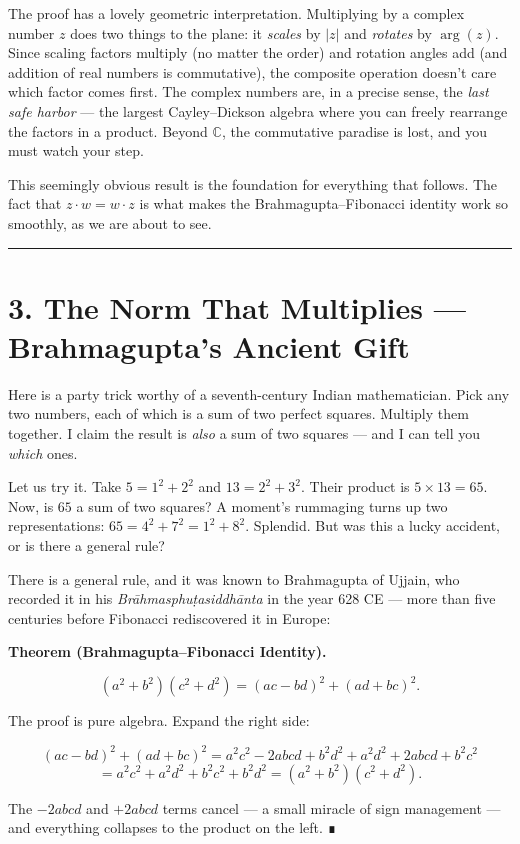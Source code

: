 The proof has a lovely geometric interpretation. Multiplying by a complex number \(z\) does two things to the plane: it \emph{scales} by \(|z|\) and \emph{rotates} by \(\arg(z)\). Since scaling factors multiply (no matter the order) and rotation angles add (and addition of real numbers is commutative), the composite operation doesn't care which factor comes first. The complex numbers are, in a precise sense, the \emph{last safe harbor} --- the largest Cayley--Dickson algebra where you can freely rearrange the factors in a product. Beyond \(\mathbb{C}\), the commutative paradise is lost, and you must watch your step.

This seemingly obvious result is the foundation for everything that follows. The fact that \(z \cdot w = w \cdot z\) is what makes the Brahmagupta--Fibonacci identity work so smoothly, as we are about to see.

\bigskip\noindent\rule{\linewidth}{0.4pt}\bigskip

\section{3. The Norm That Multiplies --- Brahmagupta's Ancient Gift}
Here is a party trick worthy of a seventh-century Indian mathematician. Pick any two numbers, each of which is a sum of two perfect squares. Multiply them together. I claim the result is \emph{also} a sum of two squares --- and I can tell you \emph{which} ones.

Let us try it. Take \(5 = 1^2 + 2^2\) and \(13 = 2^2 + 3^2\). Their product is \(5 \times 13 = 65\). Now, is \(65\) a sum of two squares? A moment's rummaging turns up two representations: \(65 = 4^2 + 7^2 = 1^2 + 8^2\). Splendid. But was this a lucky accident, or is there a general rule?

There is a general rule, and it was known to Brahmagupta of Ujjain, who recorded it in his \emph{Brāhmasphuṭasiddhānta} in the year 628 CE --- more than five centuries before Fibonacci rediscovered it in Europe:

\textbf{Theorem (Brahmagupta--Fibonacci Identity).}

\[(a^2 + b^2)(c^2 + d^2) = (ac - bd)^2 + (ad + bc)^2.\]

The proof is pure algebra. Expand the right side:

\[(ac - bd)^2 + (ad + bc)^2 = a^2c^2 - 2abcd + b^2d^2 + a^2d^2 + 2abcd + b^2c^2\] \[= a^2c^2 + a^2d^2 + b^2c^2 + b^2d^2 = (a^2 + b^2)(c^2 + d^2).\]

The \(-2abcd\) and \(+2abcd\) terms cancel --- a small miracle of sign management --- and everything collapses to the product on the left. ∎


